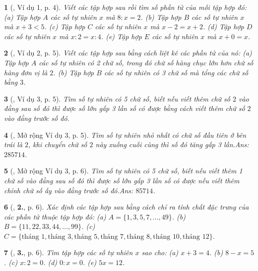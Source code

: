 \documentclass{article}
\newtheorem{baitoan}{}
\begin{document}
\begin{baitoan}[\cite{Binh_Toan_6_tap_1}, Ví dụ 1, p. 4]
	Viết các tập hợp sau rồi tìm số phần tử của mỗi tập hợp đó: (a) Tập hợp $A$ các số tự nhiên $x$ mà $8:x = 2$. (b) Tập hợp $B$ các số tự nhiên $x$ mà $x + 3 < 5$. (c) Tập hợp $C$ các số tự nhiên $x$ mà $x - 2 = x + 2$. (d) Tập hợp $D$ các số tự nhiên $x$ mà $x:2 = x:4$. (e) Tập hợp $E$ các số tự nhiên $x$ mà $x + 0 = x$.
\end{baitoan}

\begin{baitoan}[\cite{Binh_Toan_6_tap_1}, Ví dụ 2, p. 5]
	Viết các tập hợp sau bằng cách liệt kê các phần tử của nó: (a) Tập hợp $A$ các số tự nhiên có 2 chữ số, trong đó chữ số hàng chục lớn hơn chữ số hàng đơn vị là $2$. (b) Tập hợp $B$ các số tự nhiên có 3 chữ số mà tổng các chữ số bằng $3$.
\end{baitoan}

\begin{baitoan}[\cite{Binh_Toan_6_tap_1}, Ví dụ 3, p. 5]
	Tìm số tự nhiên có 5 chữ số, biết nếu viết thêm chữ số $2$ vào đằng sau số đó thì được số lớn gấp 3 lần số có được bằng cách viết thêm chữ số $2$ vào đằng trước số đó.
\end{baitoan}

\begin{baitoan}[\cite{Binh_Toan_6_tap_1}, Mở rộng Ví dụ 3, p. 5]
	Tìm số tự nhiên nhỏ nhất có chữ số đầu tiên ở bên trái là $2$, khi chuyển chữ số $2$ này xuống cuối cùng thì số đó tăng gấp 3 lần.\hfill{\sf Ans:} $285714$.
\end{baitoan}

\begin{baitoan}[\cite{Binh_Toan_6_tap_1}, Mở rộng Ví dụ 3, p. 6]
	Tìm số tự nhiên có 5 chữ số, biết nếu viết thêm 1 chữ số vào đằng sau số đó thì được số lớn gấp 3 lần số có được nếu viết thêm chính chữ số ấy vào đằng trước số đó.\hfill{\sf Ans:} $85714$.
\end{baitoan}

\begin{baitoan}[\cite{Binh_Toan_6_tap_1}, \textbf{2.}, p. 6]
	Xác định các tập hợp sau bằng cách chỉ ra tính chất đặc trưng của các phần tử thuộc tập hợp đó: (a) $A = \{1,3,5,7,\ldots,49\}$. (b) $B = \{11,22,33,44,\ldots,99\}$. (c) $C = \{\mbox{tháng } 1,\mbox{tháng } 3,\mbox{tháng } 5,\mbox{tháng } 7,\mbox{tháng } 8,\mbox{tháng } 10,\mbox{tháng } 12\}$.
\end{baitoan}

\begin{baitoan}[\cite{Binh_Toan_6_tap_1}, \textbf{3.}, p. 6]
	Tìm tập hợp các số tự nhiên $x$ sao cho: (a) $x + 3 = 4$. (b) $8 - x = 5$. (c) $x:2 = 0$. (d) $0:x = 0$. (e) $5x = 12$.
\end{baitoan}
\end{document}
